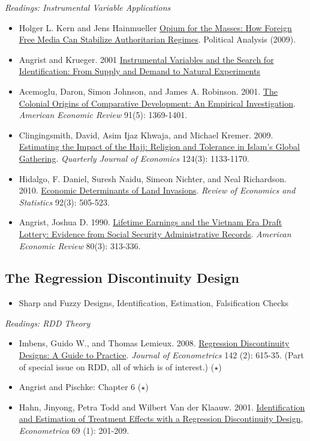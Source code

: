 \documentclass{article}
\begin{document}
\emph{Readings: Instrumental Variable Applications}
\begin{itemize}
\item Holger L. Kern and Jens Hainmueller  \href{https://web.stanford.edu/~jhain/Paper/PA2009.pdf} {Opium for the Masses: How Foreign Free Media Can Stabilize Authoritarian Regimes}. Political Analysis (2009).
\item  Angrist and Krueger. 2001  \href{http://www.jstor.org/stable/2696517} {Instrumental Variables and the Search for Identification: From Supply and Demand to Natural Experiments}
\item Acemoglu, Daron, Simon Johnson, and James A. Robinson. 2001.  \href{http://www.jstor.org/stable/2677930} {The Colonial Origins of Comparative Development: An Empirical Investigation}. \textit{American Economic Review} 91(5): 1369-1401.
\item Clingingsmith, David, Asim Ijaz Khwaja, and Michael Kremer. 2009.  \href{http://qje.oxfordjournals.org/content/124/3/1133.short} {Estimating the Impact of the Hajj: Religion and Tolerance in Islam's Global Gathering}. \textit{Quarterly Journal of Economics} 124(3): 1133-1170.
\item Hidalgo, F. Daniel, Suresh Naidu, Simeon Nichter, and Neal Richardson. 2010. \href{http://www.mitpressjournals.org/doi/abs/10.1162/REST_a_00007}{Economic Determinants of Land Invasions}. \textit{Review of Economics and Statistics} 92(3): 505-523.
\item Angrist, Joshua D. 1990.  \href{http://www.jstor.org/stable/2006669} {Lifetime Earnings and the Vietnam Era Draft Lottery: Evidence from Social Security Administrative Records}. \textit{American
Economic Review} 80(3): 313-336.
\end{itemize}


\subsection{The Regression Discontinuity Design}

\begin{itemize}
\item Sharp and Fuzzy Designs, Identification, Estimation, Falsification Checks
\end{itemize}


\emph{Readings: RDD Theory}
\begin{itemize}
\item Imbens, Guido W., and Thomas Lemieux. 2008.  \href{http://linkinghub.elsevier.com/retrieve/pii/S0304407607001091} {Regression Discontinuity
Designs: A Guide to Practice}. \textit{Journal of Econometrics} 142 (2): 615-35. (Part
of special issue on RDD, all of which is of interest.) ($\star$)
\item  Angrist and Pischke: Chapter 6 ($\star$)
\item Hahn, Jinyong, Petra Todd and Wilbert Van der Klaauw. 2001.  \href{http://www.jstor.org/stable/2692190} {Identification and Estimation of Treatment Effects with a Regression Discontinuity Design}, \textit{Econometrica} 69 (1): 201-209.
\end{itemize}
\end{document}
